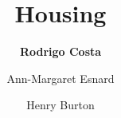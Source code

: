 %
%
%


%
%
%
%
%
%
%
%

\title{Housing}
\author{
    \textbf{Rodrigo Costa}
    \and{Ann-Margaret Esnard}
    \and{Henry Burton}}
\tocauthor{}
%
%
\maketitle


